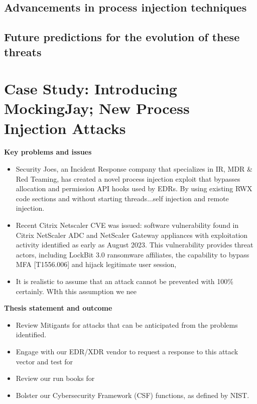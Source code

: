 \documentclass{article}
\begin{document}
\subsection{Advancements in process injection techniques}

\subsection{Future predictions for the evolution of these threats}



\section{Case Study: Introducing MockingJay; New Process Injection Attacks}

\textbf{Key problems and issues}
\begin{itemize}
\item Security Joes, an Incident Response company that specializes in IR, MDR \& Red Teaming, has created a novel process injection
  exploit that bypasses allocation and permission API hooks used by EDRs.  By using existing RWX code sections and without starting threads...self injection and remote injection.
\item Recent Citrix Netscaler CVE was issued: software vulnerability found in Citrix NetScaler ADC and NetScaler Gateway appliances with exploitation activity identified as early as August 2023. This vulnerability provides threat actors, including LockBit 3.0 ransomware affiliates, the capability to bypass MFA [T1556.006] and hijack legitimate user session,
\item It is realistic to assume that an attack cannot be prevented with 100\% certainly.  WIth this assumption we nee
\end{itemize}

\textbf{Thesis statement and outcome}
\begin{itemize}
\item Review Mitigants for attacks that can be anticipated from the problems identified.
\item Engage with our EDR/XDR vendor to request a response to this attack vector and test for 
\item Review our run books for
  \item Bolster our Cybersecurity Framework (CSF) functions, as defined by NIST.
\end{itemize}
\end{document}
